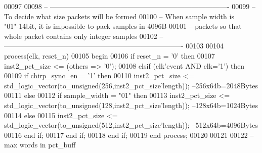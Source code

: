 \begin{DoxyCode}
00097 
00098 \textcolor{keyword}{-- ----------------------------------------------------------------------------}
00099 \textcolor{keyword}{-- To decide what size packets will be formed}
00100 \textcolor{keyword}{-- When sample width is "01"-14bit, it is impossible to pack samples in 4096B }
00101 \textcolor{keyword}{-- packets so that whole packet contains only integer samples}
00102 \textcolor{keyword}{-- ----------------------------------------------------------------------------}
00103 
00104 \textcolor{keywordflow}{process}(clk, reset_n)
00105 \textcolor{vhdlkeyword}{begin}
00106    \textcolor{keywordflow}{if} \textcolor{vhdlchar}{reset_n} \textcolor{vhdlchar}{=} \textcolor{vhdlchar}{'}\textcolor{vhdllogic}{}\textcolor{vhdllogic}{0}\textcolor{vhdlchar}{'} \textcolor{keywordflow}{then} 
00107       inst2\_pct\_size <= (\textcolor{keywordflow}{others} => '0');
00108    \textcolor{keywordflow}{elsif} \textcolor{vhdlchar}{(}\textcolor{vhdlchar}{clk}\textcolor{vhdlchar}{'}\textcolor{vhdlkeyword}{event} \textcolor{keywordflow}{AND} \textcolor{vhdlchar}{clk}\textcolor{vhdlchar}{=}\textcolor{vhdlchar}{'}\textcolor{vhdllogic}{}\textcolor{vhdllogic}{1}\textcolor{vhdlchar}{'}\textcolor{vhdlchar}{)} \textcolor{keywordflow}{then}
00109         \textcolor{keywordflow}{if} \textcolor{vhdlchar}{chirp_sync_en} \textcolor{vhdlchar}{=} \textcolor{vhdlchar}{'}\textcolor{vhdllogic}{}\textcolor{vhdllogic}{1}\textcolor{vhdlchar}{'} \textcolor{keywordflow}{then}
00110                 inst2\_pct\_size <= \textcolor{comment}{std\_logic\_vector}(to\_unsigned(\textcolor{vhdllogic}{256},inst2\_pct\_size'length)); 
      --256x64b=2048Bytes
00111         \textcolor{keywordflow}{else}            
00112             \textcolor{keywordflow}{if} \textcolor{vhdlchar}{sample_width} \textcolor{vhdlchar}{=} \textcolor{vhdllogic}{"01"} \textcolor{keywordflow}{then} 
00113                 inst2\_pct\_size <= \textcolor{comment}{std\_logic\_vector}(to\_unsigned(\textcolor{vhdllogic}{128},inst2\_pct\_size'length)); 
      --128x64b=1024Bytes
00114             \textcolor{keywordflow}{else} 
00115                 inst2\_pct\_size <= \textcolor{comment}{std\_logic\_vector}(to\_unsigned(\textcolor{vhdllogic}{512},inst2\_pct\_size'length)); 
      --512x64b=4096Bytes
00116             \textcolor{keywordflow}{end} \textcolor{keywordflow}{if};
00117         \textcolor{keywordflow}{end} \textcolor{keywordflow}{if};
00118    \textcolor{keywordflow}{end} \textcolor{keywordflow}{if};
00119 \textcolor{keywordflow}{end} \textcolor{keywordflow}{process};
00120 
00121 
00122 \textcolor{keyword}{--max words in pct\_buff}

\end{DoxyCode}
